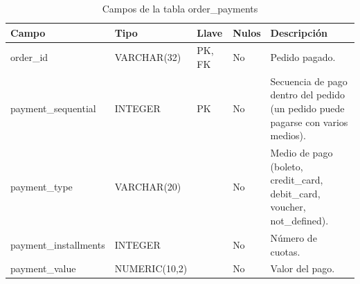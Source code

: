 \documentclass[a4paper,stu,12pt,donotrepeattitle,floatsintext]{apa7}
\begin{document}
{\footnotesize
\begin{longtable}{|>{\raggedright\arraybackslash}p{}|>{\raggedright\arraybackslash}p{}|>{\raggedright\arraybackslash}p{}|>{\raggedright\arraybackslash}p{}|>{\raggedright\arraybackslash}p{}|}
\caption{Campos de la tabla order\_payments}\\
\hline
\textbf{Campo} & \textbf{Tipo} & \textbf{Llave} & \textbf{Nulos} & \textbf{Descripción} \\ \hline
\endhead
order\_\allowbreak{}id & VARCHAR(32) & PK, FK & No & Pedido pagado. \\ \hline
payment\_\allowbreak{}sequential & INTEGER & PK & No & Secuencia de pago dentro del pedido (un pedido puede pagarse con varios medios). \\ \hline
payment\_\allowbreak{}type & VARCHAR(20) &  & No & Medio de pago (boleto, credit\_\allowbreak{}card, debit\_\allowbreak{}card, voucher, not\_\allowbreak{}defined). \\ \hline
payment\_\allowbreak{}installments & INTEGER &  & No & Número de cuotas. \\ \hline
payment\_\allowbreak{}value & NUMERIC(10,2) &  & No & Valor del pago. \\ \hline
\end{longtable}
}
\end{document}
